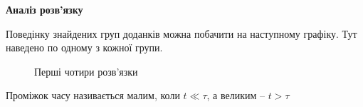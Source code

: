 \begin{center}
    \textbf{Аналіз розв'язку}
\end{center}

Поведінку знайдених груп доданків можна побачити на наступному графіку. Тут наведено по одному з кожної групи. %
\begin{figure}[h]
    \centering
\caption{Перші чотири розв'язки}
\end{figure}

Проміжок часу називається малим, коли $t \ll \tau$, а великим -- $t > \tau$

%